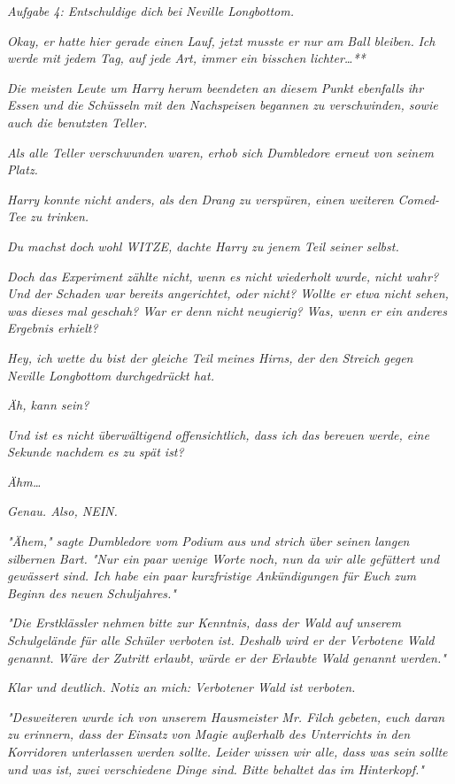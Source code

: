 {\emph{\emph{Aufgabe 4: Entschuldige dich bei Neville Longbottom.}}

\emph{Okay, er hatte hier gerade einen Lauf, jetzt musste er nur am Ball bleiben.} \emph{\emph{Ich werde mit jedem Tag, auf jede Art, immer ein bisschen lichter…}**}

\emph{Die meisten Leute um Harry herum beendeten an diesem Punkt ebenfalls ihr Essen und die Schüsseln mit den Nachspeisen begannen zu verschwinden, sowie auch die benutzten Teller.}

\emph{Als alle Teller verschwunden waren, erhob sich Dumbledore erneut von seinem Platz.}

\emph{Harry konnte nicht anders, als den Drang zu verspüren, einen weiteren Comed-Tee zu trinken.}

\emph{\emph{Du machst}} \emph{\emph{doch}} \emph{\emph{wohl WITZE,}} \emph{dachte Harry zu jenem Teil seiner selbst.}

\emph{Doch das Experiment zählte nicht, wenn es nicht wiederholt wurde, nicht wahr? Und der Schaden war bereits angerichtet, oder nicht? Wollte er etwa nicht sehen, was} \emph{\emph{dieses}} \emph{mal geschah? War er denn nicht} \emph{\emph{neugierig?}} \emph{Was, wenn er ein anderes Ergebnis erhielt?}

\emph{\emph{Hey, ich wette du bist der gleiche Teil meines Hirns, der den Streich gegen Neville}} \emph{\emph{Longbottom}} \emph{\emph{durchgedrückt hat.}}

\emph{Äh, kann sein?}

\emph{\emph{Und ist es nicht}} \emph{überwältigend} \emph{\emph{offensichtlich, dass ich das bereuen werde, eine Sekunde nachdem es zu spät ist?}}

\emph{Ähm…}

\emph{\emph{Genau. Also, NEIN.}}

\emph{"Ähem," sagte Dumbledore vom Podium aus und strich über seinen langen silbernen Bart. "Nur ein paar wenige Worte noch, nun da wir alle gefüttert und gewässert sind. Ich habe ein paar kurzfristige Ankündigungen für Euch zum Beginn des neuen Schuljahres."}

\emph{"Die Erstklässler nehmen bitte zur Kenntnis, dass der Wald auf unserem Schulgelände für alle Schüler verboten ist. Deshalb wird er der Verbotene Wald genannt. Wäre der Zutritt erlaubt, würde er der Erlaubte Wald genannt werden."}

\emph{Klar und deutlich.} \emph{\emph{Notiz an mich: Verbotener Wald ist verboten.}}

\emph{"Desweiteren wurde ich von unserem Hausmeister Mr. Filch gebeten, euch daran zu erinnern, dass der Einsatz von Magie außerhalb des Unterrichts in den Korridoren unterlassen werden sollte. Leider wissen wir alle, dass was sein} \emph{\emph{sollte}} \emph{und was} \emph{\emph{ist,}} \emph{zwei verschiedene Dinge sind. Bitte behaltet das im Hinterkopf."}

}
